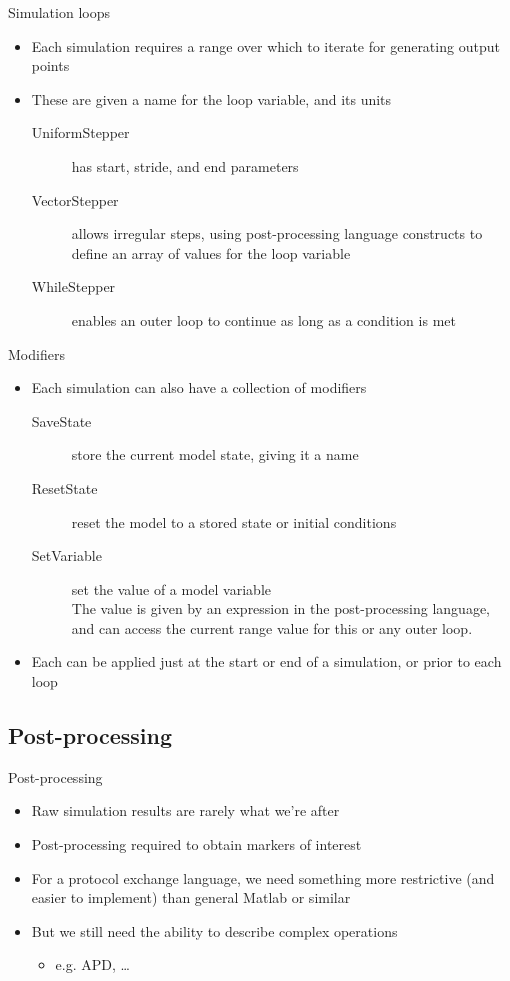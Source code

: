 \documentclass[t,xcolor={usenames,dvipsnames}]{beamer}
\newcommand{\subitem}[1]{\begin{itemize}[<.->]\item #1 \end{itemize}}
\begin{document}
\begin{frame}{Simulation loops}
\begin{itemize}
\item Each simulation requires a \alert{range} over which to iterate for generating output points
\item These are given a name for the loop variable, and its units
  \begin{description}
  \item[UniformStepper] has start, stride, and end parameters
  \item[VectorStepper] allows irregular steps, using post-processing language constructs to define an array of values for the loop variable
  \item[WhileStepper] enables an outer loop to continue as long as a condition is met
  \end{description}
\end{itemize}
\end{frame}

\begin{frame}{Modifiers}
\begin{itemize}
\item Each simulation can also have a collection of \alert{modifiers}
  \begin{description}
  \item[SaveState] store the current model state, giving it a name
  \item[ResetState] reset the model to a stored state or initial conditions
  \item[SetVariable] set the value of a model variable\\
      The value is given by an expression in the post-processing language,
      and can access the current range value for this or any outer loop.
  \end{description}
\item Each can be applied just at the start or end of a simulation, or prior to each loop
\end{itemize}
\end{frame}

\subsection{Post-processing}

\begin{frame}{Post-processing}
\begin{itemize}
\item Raw simulation results are rarely what we're after
\item Post-processing required to obtain markers of interest
\item For a protocol exchange language, we need something more restrictive (and easier to implement) than general Matlab or similar
\item But we still need the ability to describe complex operations
  \subitem{e.g. APD, \ldots}
\end{itemize}
\end{frame}
\end{document}
